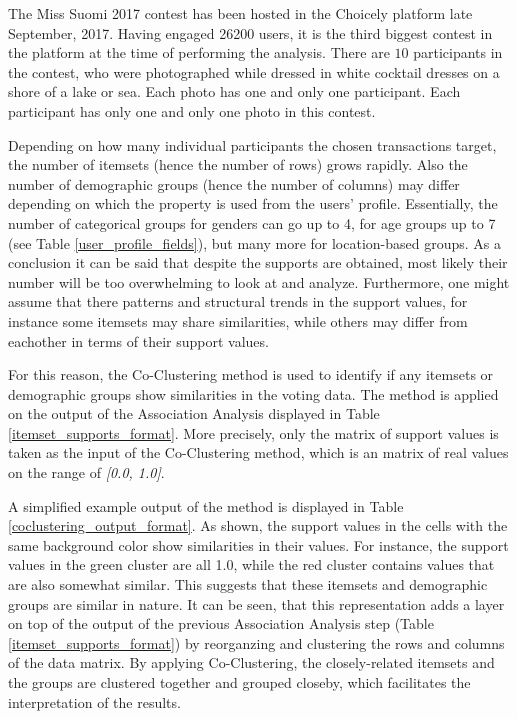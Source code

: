     The Miss Suomi 2017 contest has been hosted in the Choicely platform late September, 2017. Having engaged 26200 users, it is the third biggest contest in the platform at the time of performing the analysis. There are $10$ participants in the contest, who were photographed while dressed in white cocktail dresses on a shore of a lake or sea. Each photo has one and only one participant. Each participant has only one and only one photo in this contest. 
    
    Depending on how many individual participants the chosen transactions target, the number of itemsets (hence the number of rows) grows rapidly. Also the number of demographic groups (hence the number of columns) may differ depending on which the property is used from the users' profile. Essentially, the number of categorical groups for genders can go up to 4, for age groups up to 7 (see Table \ref{user_profile_fields}), but many more for location-based groups. As a conclusion it can be said that despite the supports are obtained, most likely their number will be too overwhelming to look at and analyze. Furthermore, one might assume that there patterns and structural trends in the support values, for instance some itemsets may share similarities, while others may differ from eachother in terms of their support values.

    For this reason, the Co-Clustering method is used to identify if any itemsets or demographic groups show similarities in the voting data. The method is applied on the output of the Association Analysis displayed in Table \ref{itemset_supports_format}. More precisely, only the matrix of support values is taken as the input of the Co-Clustering method, which is an matrix of real values on the range of \emph{[0.0, 1.0]}. 
    
    A simplified example output of the method is displayed in Table \ref{coclustering_output_format}. As shown, the support values in the cells with the same background color show similarities in their values. For instance, the support values in the green cluster are all 1.0, while the red cluster contains values that are also somewhat similar. This suggests that these itemsets and demographic groups are similar in nature. It can be seen, that this representation adds a layer on top of the output of the previous Association Analysis step (Table \ref{itemset_supports_format}) by reorganzing and clustering the rows and columns of the data matrix. By applying Co-Clustering, the closely-related itemsets and the groups are clustered together and grouped closeby, which facilitates the interpretation of the results. 

